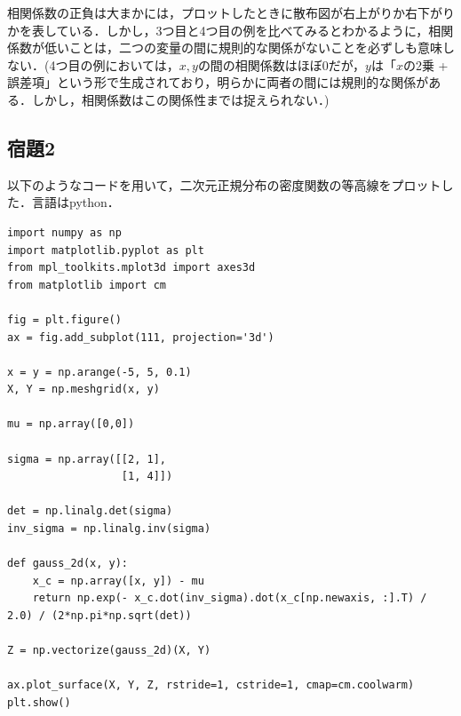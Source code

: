 \documentclass[11pt,a4paper,dvipdfmx]{article}
\theoremstyle{plain}
\newcommand{\1}{\mbox{1}\hspace{-0.25em}\mbox{l}}
\begin{document}
相関係数の正負は大まかには，プロットしたときに散布図が右上がりか右下がりかを表している．しかし，3つ目と4つ目の例を比べてみるとわかるように，相関係数が低いことは，二つの変量の間に規則的な関係がないことを必ずしも意味しない．(4つ目の例においては，$x,y$の間の相関係数はほぼ0だが，$y$は「$x$の2乗 + 誤差項」という形で生成されており，明らかに両者の間には規則的な関係がある．しかし，相関係数はこの関係性までは捉えられない．)

\subsection{宿題2}
以下のようなコードを用いて，二次元正規分布の密度関数の等高線をプロットした．言語はpython．

\begin{lstlisting}[caption=2d Gaussian]
import numpy as np
import matplotlib.pyplot as plt
from mpl_toolkits.mplot3d import axes3d
from matplotlib import cm

fig = plt.figure()
ax = fig.add_subplot(111, projection='3d')

x = y = np.arange(-5, 5, 0.1)
X, Y = np.meshgrid(x, y)

mu = np.array([0,0])

sigma = np.array([[2, 1], 
                  [1, 4]])

det = np.linalg.det(sigma)
inv_sigma = np.linalg.inv(sigma)

def gauss_2d(x, y):
    x_c = np.array([x, y]) - mu
    return np.exp(- x_c.dot(inv_sigma).dot(x_c[np.newaxis, :].T) / 2.0) / (2*np.pi*np.sqrt(det))

Z = np.vectorize(gauss_2d)(X, Y)

ax.plot_surface(X, Y, Z, rstride=1, cstride=1, cmap=cm.coolwarm)
plt.show()
\end{lstlisting}
\end{document}
